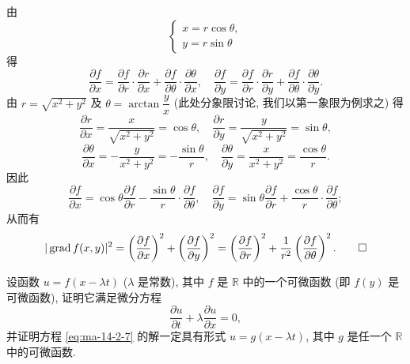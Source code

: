 \begin{solve}
由
\[
  \begin{cases}
    x=r\cos\theta,\\
    y=r\sin\theta
  \end{cases}
\]
得
\[
  \frac{\partial f}{\partial x}
  =\frac{\partial f}{\partial r}\cdot\frac{\partial r}{\partial x}
  +\frac{\partial f}{\partial\theta}\cdot\frac{\partial\theta}{\partial x},
  \quad
  \frac{\partial f}{\partial y}
  =\frac{\partial f}{\partial r}\cdot\frac{\partial r}{\partial y}
  +\frac{\partial f}{\partial\theta}\cdot\frac{\partial\theta}{\partial y}.
\]
由 $r=\sqrt{x^2+y^2}$ 及 $\theta=\arctan\dfrac yx$ (此处分象限讨论, 我们以第一象限为例求之) 得
\[
  \frac{\partial r}{\partial x}=\frac{x}{\sqrt{x^2+y^2}}=\cos\theta,\quad
  \frac{\partial r}{\partial y}=\frac{y}{\sqrt{x^2+y^2}}=\sin\theta,
\]
\[
  \frac{\partial\theta}{\partial x}=-\frac{y}{x^2+y^2}=-\frac{\sin\theta}{r},\quad
  \frac{\partial\theta}{\partial y}=\frac{x}{x^2+y^2}=\frac{\cos\theta}{r}.
\]
因此
\[
  \frac{\partial f}{\partial x}
  =\cos\theta\frac{\partial f}{\partial r}
  -\frac{\sin\theta}{r}\cdot\frac{\partial f}{\partial\theta},
  \quad
  \frac{\partial f}{\partial y}
  =\sin\theta\frac{\partial f}{\partial r}
  +\frac{\cos\theta}{r}\cdot\frac{\partial f}{\partial\theta};
\]
从而有
\[
  |\operatorname{grad}f(x,y)|^2
  =
  \left(\frac{\partial f}{\partial x}\right)^2+
  \left(\frac{\partial f}{\partial y}\right)^2
  =
  \left(\frac{\partial f}{\partial r}\right)^2+
  \frac1{r^2}\left(\frac{\partial f}{\partial\theta}\right)^2.
\qedhere
\]
\end{solve}


\begin{example}\label{example:ma-14-2-6}
设函数 $u=f(x-\lambda t)$ ($\lambda$ 是常数), 其中 $f$ 是 $\mathbb R$ 中的一个可微函数 (即 $f(y)$ 是可微函数), 证明它满足微分方程
\begin{equation}
  \frac{\partial u}{\partial t}+\lambda\frac{\partial u}{\partial x}=0,
\label{eq:ma-14-2-7}
\end{equation}
并证明方程 \eqref{eq:ma-14-2-7} 的解一定具有形式 $u=g(x-\lambda t)$, 其中 $g$ 是任一个 $\mathbb R$ 中的可微函数.
\end{example}


